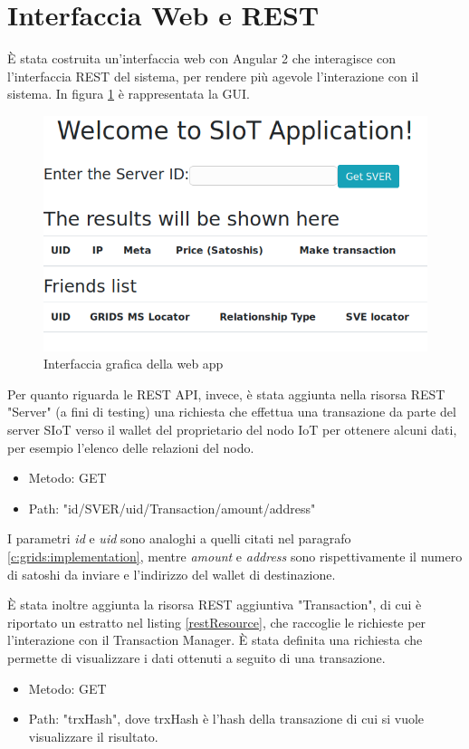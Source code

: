 \section{Interfaccia Web e REST}
\label{c:integr:webrest}

È stata costruita un'interfaccia web con Angular 2 che interagisce con l'interfaccia REST del sistema, per rendere più agevole l'interazione con il sistema. In figura \ref{f:integr:gui-web} è rappresentata la GUI.

\begin{figure}[h!t]
\centerline{\includegraphics[scale=2.5]{img/gui-web-app}}
\caption{Interfaccia grafica della web app}
\label{f:integr:gui-web}
\end{figure}

Per quanto riguarda le REST API, invece, è stata aggiunta nella risorsa REST "Server" (a fini di testing) una richiesta che effettua una transazione da parte del server SIoT verso il wallet del proprietario del nodo IoT per ottenere alcuni dati, per esempio l'elenco delle relazioni del nodo.
\begin{itemize}
    \item Metodo: GET
    \item Path: "{id}/SVER/{uid}/Transaction/{amount}/{address}"
\end{itemize}

I parametri \textit{id} e \textit{uid} sono analoghi a quelli citati nel paragrafo \ref{c:grids:implementation}, mentre \textit{amount} e \textit{address} sono rispettivamente il numero di satoshi da inviare e l'indirizzo del wallet di destinazione.

È stata inoltre aggiunta la risorsa REST aggiuntiva "Transaction", di cui è riportato un estratto nel listing \ref{restResource}, che raccoglie le richieste per l'interazione con il Transaction Manager. È stata definita una richiesta che permette di visualizzare i dati ottenuti a seguito di una transazione.
\begin{itemize}
    \item Metodo: GET
    \item Path: "{trxHash}", dove trxHash è l'hash della transazione di cui si vuole visualizzare il risultato.
\end{itemize}

